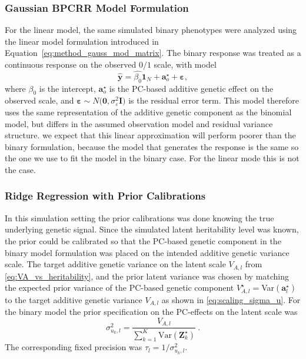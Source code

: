 \subsubsection*{Gaussian BPCRR Model Formulation}

For the linear model, the same simulated binary phenotypes were analyzed using the linear model formulation introduced in Equation~\eqref{eq:method_gauss_mod_matrix}. The binary response was treated as a continuous response on the observed $0/1$ scale, with model
%
\[
\hat{\mathbf{y}} = \hat{\beta_0}\mathbf{1}_N + \mathbf{a}^\star_o + \boldsymbol{\varepsilon},
\]
%
where $\beta_0$ is the intercept, $\mathbf{a}^\star_o$ is the PC-based additive genetic effect on the observed scale, and $\boldsymbol{\varepsilon} \sim N(\mathbf{0}, \sigma_\varepsilon^2\mathbf{I)}$ is the residual error term. This model therefore uses the same representation of the additive genetic component as the binomial model, but differs in the assumed observation model and residual variance structure. we expect that this linear approximation will perform poorer than the binary formulation, because the model that generates the response is the same so the one we use to fit the model in the binary case. For the linear mode this is not the case. 

\subsubsection*{Ridge Regression with Prior Calibrations}

In this simulation setting the prior calibrations was done knowing the true underlying genetic signal. Since the simulated latent heritability level was known, the prior could be calibrated so that the PC-based genetic component in the binary model formulation was placed on the intended additive genetic variance scale. The target additive genetic variance on the latent scale $V_{A,l}$ from \eqref{eq:VA_vs_heritability}, and the prior latent variance was chosen by matching the expected prior variance of the PC-based genetic component $V_{A, l}^\star =$Var$(\mathbf{a}^\star_l)$ to the target additive genetic variance $V_{A, l}$ as shown in \eqref{eq:scaling_sigma_u}. For the binary model the prior specification on the PC-effects on the latent scale was 
%
$$
\sigma_{u_k, l}^2 = \frac{V_{A,l}}{\sum_{k=1}^K \mathrm{Var}(\mathbf{Z}_k^\star)} \ .
$$
The corresponding fixed precision was
\(
\tau_l = 1/\sigma_{u_k,l}^2.
\)




